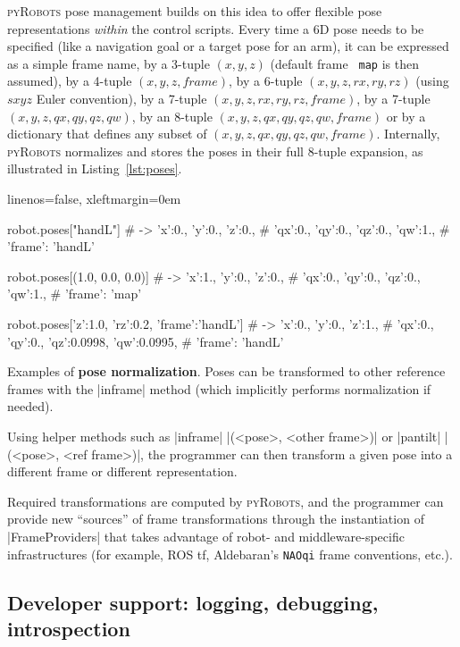 \documentclass[a4paper, 10pt, conference]{ieeeconf}      %
\newcommand{\pyRobots}{\textsc{pyRobots}}
\begin{document}
\pyRobots{} pose management builds on this idea to offer flexible pose
representations \emph{within} the control scripts. Every time a 6D pose needs to
be specified (like a navigation goal or a target pose for an arm), it can be
expressed as a simple frame name, by a 3-tuple $(x, y, z)$ (default frame {\tt
map} is then assumed), by a 4-tuple $(x, y, z, frame)$, by a 6-tuple $(x, y, z,
rx, ry, rz)$ (using $sxyz$ Euler convention), by a 7-tuple $(x, y, z, rx, ry,
rz, frame)$, by a 7-tuple $(x, y, z, qx, qy, qz, qw)$, by an 8-tuple $(x, y, z,
qx, qy, qz, qw, frame)$ or by a dictionary that defines any subset of $(x, y, z,
qx, qy, qz, qw, frame)$.  Internally, \pyRobots{} normalizes and stores the
poses in their full 8-tuple expansion, as illustrated in
Listing~\ref{lst:poses}.

\begin{listing}
    \begin{pythoncode*}{linenos=false, xleftmargin=0em}

    robot.poses["handL"]
    # -> {'x':0., 'y':0., 'z':0., 
    #    'qx':0., 'qy':0., 'qz':0., 'qw':1., 
    #    'frame': 'handL'}

    robot.poses[(1.0, 0.0, 0.0)]
    # -> {'x':1., 'y':0., 'z':0., 
    #    'qx':0., 'qy':0., 'qz':0., 'qw':1., 
    #    'frame': 'map'}

    robot.poses[{'z':1.0, 'rz':0.2, 'frame':'handL'}]
    # -> {'x':0., 'y':0., 'z':1., 
    #    'qx':0., 'qy':0., 'qz':0.0998, 'qw':0.0995, 
    #    'frame': 'handL'}

\end{pythoncode*}
\caption{Examples of \textbf{pose normalization}. Poses can be transformed to
other reference frames with the \python|inframe| method (which implicitly performs
normalization if needed).}
\label{lst:poses}
\end{listing}

Using helper methods such as \python|inframe| \python|(<pose>, <other frame>)| or
\python|pantilt| \python|(<pose>, <ref frame>)|, the programmer can then
transform a given pose into a different frame or different representation.

Required transformations are computed by \pyRobots{}, and the programmer can
provide new ``sources'' of frame transformations through the instantiation of
\python|FrameProviders| that takes advantage of robot- and middleware-specific
infrastructures (for example, ROS {\sc tf}, Aldebaran's {\tt NAOqi} frame
conventions, etc.).

\subsection{Developer support: logging, debugging, introspection}
\label{}
\end{document}
